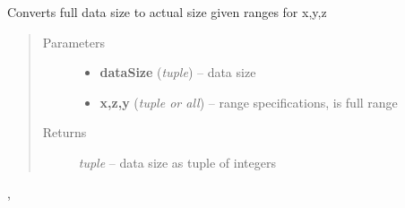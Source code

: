 \documentclass[letterpaper,10pt,english]{sphinxmanual}
\begin{document}
\begin{fulllineitems}
\label{api/ClearMap.IO:ClearMap.IO.IO.dataSizeFromDataRange}
Converts full data size to actual size given ranges for x,y,z
\begin{quote}\begin{description}
\item[{Parameters}] \leavevmode\begin{itemize}
\item {} 
\textbf{dataSize} (\emph{tuple}) --
data size

\item {} 
\textbf{x,z,y} (\emph{tuple or all}) --
range specifications,  is full range

\end{itemize}

\item[{Returns}] \leavevmode
\emph{tuple} --
data size as tuple of integers

\end{description}\end{quote}




{\hyperref[api/ClearMap.IO:ClearMap.IO.IO.toDataRange]{\emph{}}}, {\hyperref[api/ClearMap.IO:ClearMap.IO.IO.toDataSize]{\emph{}}}



\end{fulllineitems}

\end{document}
